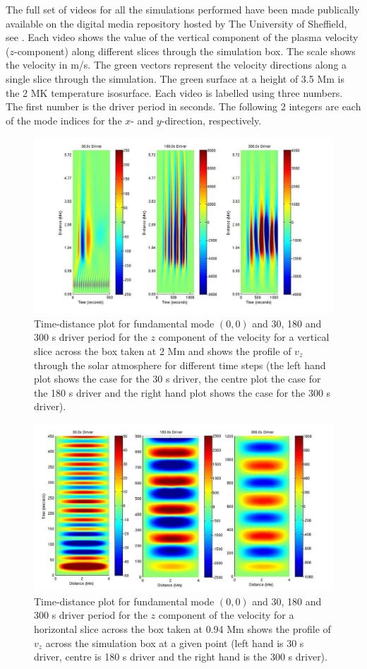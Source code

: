 \documentclass[preprint,authoryear,12pt]{elsarticle}
\begin{document}
The full set of videos for all the simulations performed have been made publically available on the digital media repository hosted by The University of Sheffield, see \citet{Griffiths2017}. Each video shows the value of the vertical component of the plasma velocity ($z$-component) along different slices through the simulation box. The scale shows the velocity in m/s. The green vectors represent the velocity directions along a single slice through the simulation. The green surface at a height of 3.5 Mm is the 2 MK temperature isosurface. 
Each video is labelled using three numbers. The first number is the driver period in seconds. The following 2 integers are each of the mode indices for the $x$- and $y$-direction, respectively.
\begin{figure}[h]
\includegraphics[scale=1.8]{imrescale/fig2_dt_30_180_300_0_vert_2Mm.jpg}
\caption{Time-distance plot for fundamental mode $(0,0)$ and 30, 180 and 300 s driver period for the $z$ component of the velocity for a vertical slice across the box  taken at 2 Mm and shows  the profile of $v_{z}$ through the solar atmosphere for different time steps (the left hand plot shows the case for the 30 s driver, the centre plot the case for the 180 s driver and the right hand plot shows the case for the 300 s  driver). }
\label{Fig3}
\end{figure}
\begin{figure}[h]
\includegraphics[scale=1]{imrescale/fig3_dt_30_180_300_0_horiz_p94Mm.jpg}
\caption{Time-distance plot for fundamental mode $(0,0)$  and 30, 180 and 300 s driver period for the $z$ component of the velocity for a horizontal slice across the box  taken at 0.94 Mm shows  the profile of $ v_{z}$ across the simulation box at a given point (left hand is 30 s driver, centre is 180 s driver and the right hand is the 300 s driver). }
\label{Fig4}
\end{figure}
\end{document}
